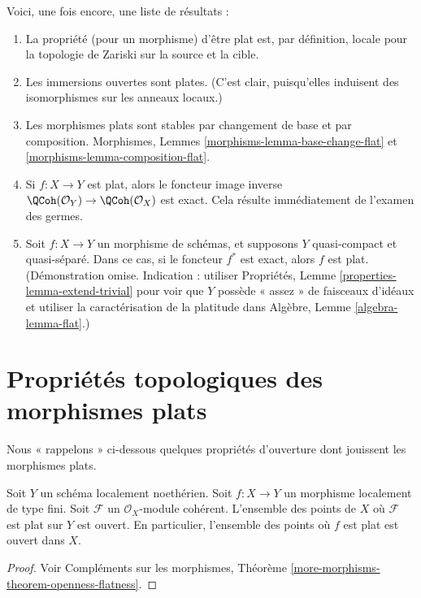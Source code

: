 \noindent
Voici, une fois encore, une liste de résultats :
\begin{enumerate}
\item La propriété (pour un morphisme) d'être plat est, par définition,
locale pour la topologie de Zariski sur la source et la cible.
\item Les immersions ouvertes sont plates. (C'est clair, puisqu'elles induisent des isomorphismes
sur les anneaux locaux.)
\item Les morphismes plats sont stables par changement de base et par composition.
Morphismes, Lemmes \ref{morphisms-lemma-base-change-flat} et
\ref{morphisms-lemma-composition-flat}.
\item Si $f : X \to Y$ est plat, alors le foncteur image inverse
$\QCoh(\mathcal{O}_Y) \to \QCoh(\mathcal{O}_X)$ est exact.
Cela résulte immédiatement de l'examen des germes.
\item Soit $f : X \to Y$ un morphisme de schémas, et supposons $Y$
quasi-compact et quasi-séparé. Dans ce cas,
si le foncteur $f^*$ est exact, alors $f$ est plat.
(Démonstration omise. Indication : utiliser
Propriétés, Lemme \ref{properties-lemma-extend-trivial} pour voir que
$Y$ possède « assez » de faisceaux d'idéaux et utiliser la caractérisation de la
platitude dans Algèbre, Lemme \ref{algebra-lemma-flat}.)
\end{enumerate}



\section{Propriétés topologiques des morphismes plats}
\label{section-topological-flat}

\noindent
Nous « rappelons » ci-dessous quelques propriétés d'ouverture dont jouissent les morphismes plats.

\begin{theorem}
\label{theorem-flat-open}
Soit $Y$ un schéma localement noethérien.
Soit $f : X \to Y$ un morphisme localement de type fini.
Soit $\mathcal{F}$ un $\mathcal{O}_X$-module cohérent.
L'ensemble des points de $X$ où $\mathcal{F}$ est plat sur $Y$ est ouvert.
En particulier, l'ensemble des points où $f$ est plat est ouvert dans $X$.
\end{theorem}

\begin{proof}
Voir Compléments sur les morphismes, Théorème \ref{more-morphisms-theorem-openness-flatness}.
\end{proof}

